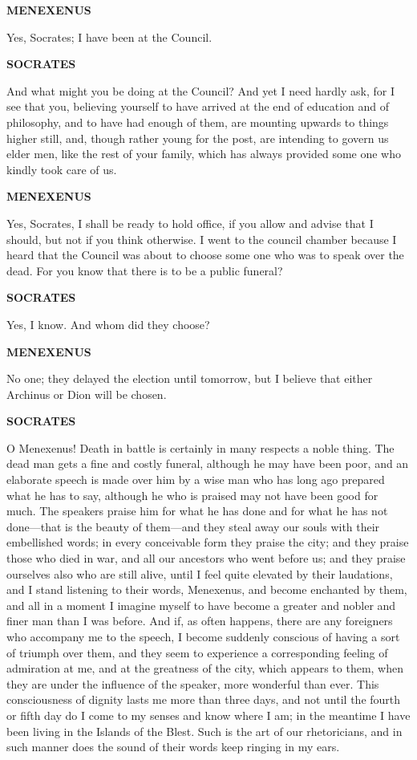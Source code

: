 \documentclass[11pt,letter]{article}
\begin{document}
\par \textbf{MENEXENUS}
\par   Yes, Socrates; I have been at the Council.

\par \textbf{SOCRATES}
\par   And what might you be doing at the Council? And yet I need hardly ask, for I see that you, believing yourself to have arrived at the end of education and of philosophy, and to have had enough of them, are mounting upwards to things higher still, and, though rather young for the post, are intending to govern us elder men, like the rest of your family, which has always provided some one who kindly took care of us.

\par \textbf{MENEXENUS}
\par   Yes, Socrates, I shall be ready to hold office, if you allow and advise that I should, but not if you think otherwise. I went to the council chamber because I heard that the Council was about to choose some one who was to speak over the dead. For you know that there is to be a public funeral?

\par \textbf{SOCRATES}
\par   Yes, I know. And whom did they choose?

\par \textbf{MENEXENUS}
\par   No one; they delayed the election until tomorrow, but I believe that either Archinus or Dion will be chosen.

\par \textbf{SOCRATES}
\par   O Menexenus! Death in battle is certainly in many respects a noble thing. The dead man gets a fine and costly funeral, although he may have been poor, and an elaborate speech is made over him by a wise man who has long ago prepared what he has to say, although he who is praised may not have been good for much. The speakers praise him for what he has done and for what he has not done—that is the beauty of them—and they steal away our souls with their embellished words; in every conceivable form they praise the city; and they praise those who died in war, and all our ancestors who went before us; and they praise ourselves also who are still alive, until I feel quite elevated by their laudations, and I stand listening to their words, Menexenus, and become enchanted by them, and all in a moment I imagine myself to have become a greater and nobler and finer man than I was before. And if, as often happens, there are any foreigners who accompany me to the speech, I become suddenly conscious of having a sort of triumph over them, and they seem to experience a corresponding feeling of admiration at me, and at the greatness of the city, which appears to them, when they are under the influence of the speaker, more wonderful than ever. This consciousness of dignity lasts me more than three days, and not until the fourth or fifth day do I come to my senses and know where I am; in the meantime I have been living in the Islands of the Blest. Such is the art of our rhetoricians, and in such manner does the sound of their words keep ringing in my ears.
\end{document}
